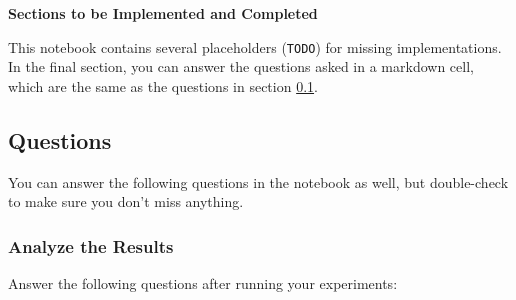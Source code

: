 \textbf{Sections to be Implemented and Completed}

This notebook contains several placeholders (\texttt{TODO}) for missing implementations. In the final section, you can answer the questions asked in a markdown cell, which are the same as the questions in section \ref{sec:mpc-questions}.

\subsection{Questions}\label{sec:mpc-questions} 
You can answer the following questions in the notebook as well, but double-check to make sure you don't miss anything.
\subsubsection{Analyze the Results} 
Answer the following questions after running your experiments: 
